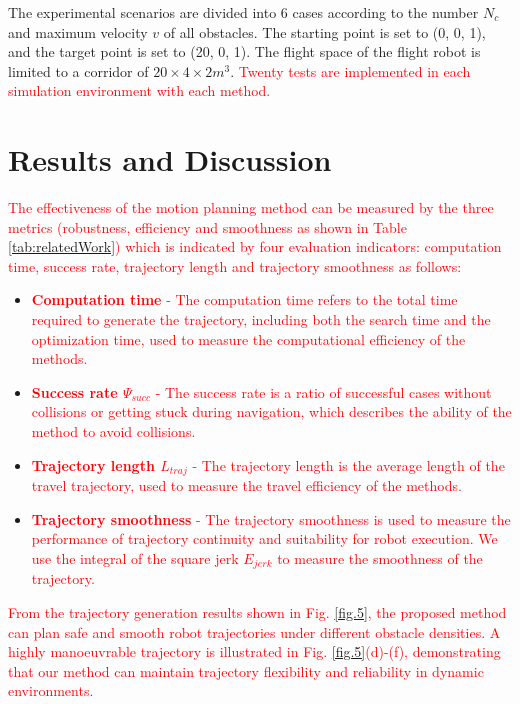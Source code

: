 \documentclass[preprint,5p,times,twocolumn,authoryear]{elsarticle}
\begin{document}
The experimental scenarios are divided into 6 cases according to the number $N_c$ and maximum velocity $v$ of all obstacles. The starting point is set to (0, 0, 1), and the target point is set to (20, 0, 1). The flight space of the flight robot is limited to a corridor of $20\times4\times2 m^3$. \textcolor{red}{Twenty tests are implemented in each simulation environment with each method.}


\section{Results and Discussion}
\label{Results}

\textcolor{red}{The effectiveness of the motion planning method can be measured by the three metrics (robustness, efficiency and smoothness as shown in Table \ref{tab:relatedWork}) which is indicated by four evaluation indicators: computation time, success rate, trajectory length and trajectory smoothness as follows:}

\begin{itemize}
\item \textcolor{red}{
\textbf{Computation time} - The computation time refers to the total time required to generate the trajectory, including both the search time and the optimization time, used to measure the computational efficiency of the methods.}

\item \textcolor{red}{
\textbf{Success rate $\Psi_{succ}$} - The success rate is a ratio of successful cases without collisions or getting stuck during navigation, which describes the ability of the method to avoid collisions.}

\item \textcolor{red}{
\textbf{Trajectory length $L_{traj}$} - The trajectory length is the average length of the travel trajectory, used to measure the travel efficiency of the methods.}

\item \textcolor{red}{
\textbf{Trajectory smoothness} - The trajectory smoothness is used to measure the performance of trajectory continuity and suitability for robot execution. We use the integral of the square jerk $E_{jerk}$ to measure the smoothness of the trajectory.}

\end{itemize}

\textcolor{red}{
From the trajectory generation results shown in Fig. \ref{fig.5}, the proposed method can plan safe and smooth robot trajectories under different obstacle densities. A highly manoeuvrable trajectory is illustrated in Fig. \ref{fig.5}(d)-(f), demonstrating that our method can maintain trajectory flexibility and reliability in dynamic environments.}
\end{document}
